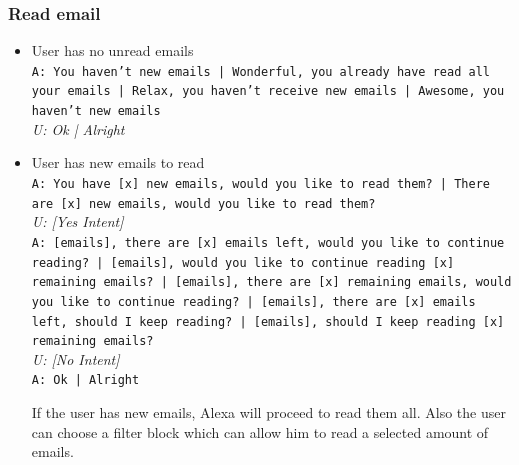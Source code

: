 \subsubsection{Read email}
\begin{itemize}
	\item User has no unread emails\\
	\texttt{A: You haven't new emails | Wonderful, you already have read all your emails | Relax, you haven't receive new emails | Awesome, you haven't new emails}\\
	\textit{U: Ok | Alright}
	\item User has new emails to read\\
	\texttt{A: You have [x] new emails, would you like to read them? | There are [x] new emails, would you like to read them? }\\
	\textit{U: [Yes Intent]}\\
	\texttt{A: [emails], there are [x] emails left, would you like to continue reading? | [emails], would you like to continue reading [x] remaining emails? | [emails], there are [x] remaining emails, would you like to continue reading? | [emails], there are [x] emails left, should I keep reading? | [emails], should I keep reading [x] remaining emails?}\\
	\textit{U: [No Intent] }\\
	\texttt{A: Ok | Alright}
	
	If the user has new emails, Alexa will proceed to read them all. Also the user can choose a filter block which can allow him to read a selected amount of emails.
\end{itemize}

